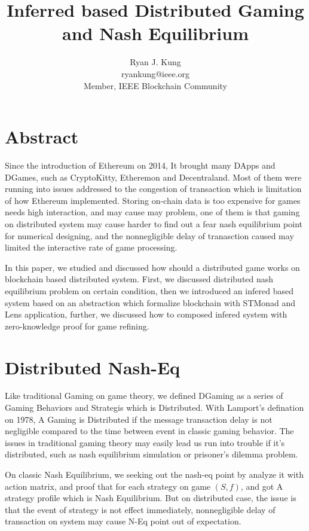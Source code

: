 \documentclass[twocolumn]{article}
\author{Ryan J. Kung \\ryankung@ieee.org\\Member, IEEE Blockchain Community }
\title{Inferred based Distributed Gaming and Nash Equilibrium}
\begin{document}
\maketitle
\section{Abstract}

Since the introduction of Ethereum on 2014\cite{ethereum}, It brought many DApps and DGames, such as CryptoKitty, Etheremon and Decentraland. Most of them were running into issues addressed to the congestion of transaction which is limitation of how Ethereum implemented. Storing on-chain data is too expensive for games needs high interaction, and may cause may problem, one of them is that gaming on distributed system may cause harder to find out a fear nash equilibrium point for numerical designing, and the nonnegligible delay of tranasction caused may limited the interactive rate of game processing.

In this paper, we studied and discussed how should a distributed game works on blockchain based distributed system. First, we discussed distributed nash equilibrium problem on certain condition, then we introduced an infered based system based on an abstraction which formalize blockchain with STMonad and Lens application, further, we discussed how to composed infered system with zero-knowledge proof for game refining.

\section{Distributed Nash-Eq}

Like traditional Gaming on game theory, we defined DGaming as a series of Gaming Behaviors and Strategis which is Distributed. With Lamport's defination on 1978\cite{time-clocks-ordering-events-distributed-system}, A Gaming is Distributed if the message transaction delay is not negligible compared to the time between event in classic gaming behavior. The issues in traditional gaming theory may easily lead us run into trouble if it's distributed, such as nash equilibrium simulation or prisoner's dilemma problem.

On classic Nash Equilibrium, we seeking out the nash-eq point by analyze it with action matrix, and proof that for each strategy on game $(S, f)$, and got A strategy profile which is Nash Equilibrium. But on distributed case, the issue is that the event of strategy is not effect immediately, nonnegligible delay of transaction on system may cause N-Eq point out of expectation.
\end{document}
